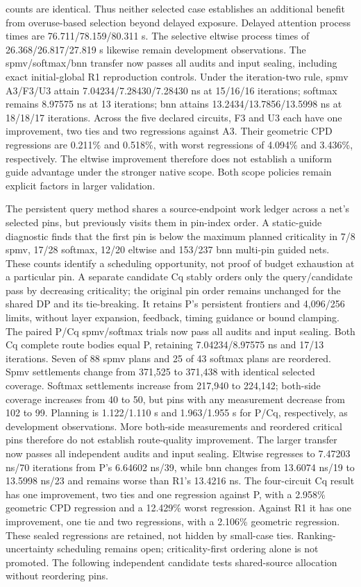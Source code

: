 \documentclass[conference,10pt]{IEEEtran}
\begin{document}
counts are identical. Thus neither selected case establishes an additional benefit from overuse-based selection beyond delayed exposure. Delayed attention process times are 76.711/78.159/80.311 s. The selective eltwise process times of 26.368/26.817/27.819 s likewise remain development observations. The spmv/softmax/bnn transfer now passes all audits and input sealing, including exact initial-global R1 reproduction controls. Under the iteration-two rule, spmv A3/F3/U3 attain 7.04234/7.28430/7.28430 ns at 15/16/16 iterations; softmax remains 8.97575 ns at 13 iterations; bnn attains 13.2434/13.7856/13.5998 ns at 18/18/17 iterations. Across the five declared circuits, F3 and U3 each have one improvement, two ties and two regressions against A3. Their geometric CPD regressions are 0.211\% and 0.518\%, with worst regressions of 4.094\% and 3.436\%, respectively. The eltwise improvement therefore does not establish a uniform guide advantage under the stronger native scope. Both scope policies remain explicit factors in larger validation.

The persistent query method shares a source-endpoint work ledger across a net's selected pins, but previously visits them in pin-index order. A static-guide diagnostic finds that the first pin is below the maximum planned criticality in 7/8 spmv, 17/28 softmax, 12/20 eltwise and 153/237 bnn multi-pin guided nets. These counts identify a scheduling opportunity, not proof of budget exhaustion at a particular pin. A separate candidate Cq stably orders only the query/candidate pass by decreasing criticality; the original pin order remains unchanged for the shared DP and its tie-breaking. It retains P's persistent frontiers and 4,096/256 limits, without layer expansion, feedback, timing guidance or bound clamping. The paired P/Cq spmv/softmax trials now pass all audits and input sealing. Both Cq complete route bodies equal P, retaining 7.04234/8.97575 ns and 17/13 iterations. Seven of 88 spmv plans and 25 of 43 softmax plans are reordered. Spmv settlements change from 371,525 to 371,438 with identical selected coverage. Softmax settlements increase from 217,940 to 224,142; both-side coverage increases from 40 to 50, but pins with any measurement decrease from 102 to 99. Planning is 1.122/1.110 s and 1.963/1.955 s for P/Cq, respectively, as development observations. More both-side measurements and reordered critical pins therefore do not establish route-quality improvement. The larger transfer now passes all independent audits and input sealing. Eltwise regresses to 7.47203 ns/70 iterations from P's 6.64602 ns/39, while bnn changes from 13.6074 ns/19 to 13.5998 ns/23 and remains worse than R1's 13.4216 ns. The four-circuit Cq result has one improvement, two ties and one regression against P, with a 2.958\% geometric CPD regression and a 12.429\% worst regression. Against R1 it has one improvement, one tie and two regressions, with a 2.106\% geometric regression. These sealed regressions are retained, not hidden by small-case ties. Ranking-uncertainty scheduling remains open; criticality-first ordering alone is not promoted. The following independent candidate tests shared-source allocation without reordering pins.
\end{document}
